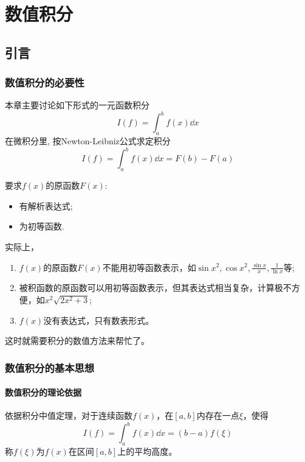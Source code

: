\chapter{数值积分}

\section{引言}

\subsection{数值积分的必要性}
本章主要讨论如下形式的一元函数积分
\begin{equation*}
    I(f) = \int_{a}^{b}f(x)\dd{x}
\end{equation*}
在微积分里, 按Newton-Leibniz公式求定积分
\begin{equation*}
    I(f) = \int_{a}^{b}f(x)\dd{x} = F(b)-F(a)
\end{equation*}

要求$f(x)$的原函数$F(x)$:
\begin{itemize}
    \item 有解析表达式;
    \item 为初等函数.
\end{itemize}

实际上，
\begin{enumerate}
    \item $f(x)$的原函数$F(x)$不能用初等函数表示，如$\sin{x^2},\cos{x^2},\frac{\sin{x}}{x},\frac{1}{\ln{x}}$等;
    \item 被积函数的原函数可以用初等函数表示，但其表达式相当复杂，计算极不方便，如$x^2\sqrt{2x^2+3}$;
    \item $f(x)$没有表达式，只有数表形式。
\end{enumerate}
这时就需要积分的数值方法来帮忙了。

\subsection{数值积分的基本思想}
\subsubsection{数值积分的理论依据}
依据积分中值定理，对于连续函数$f(x)$，在$[a,b]$内存在一点$\xi $，使得
    \begin{equation*}
       I(f) = \int_{a}^{b}f(x)\dd{x} = (b-a)f(\xi )
    \end{equation*}
称$f(\xi )$为$f(x)$在区间$[a,b]$上的平均高度。

